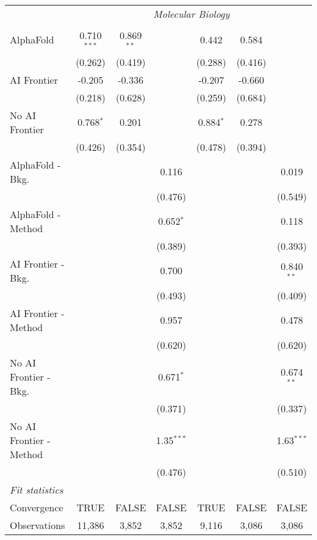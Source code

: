 \begin{tabular}{lcccccc}
 & \multicolumn{6}{c}{\textit{Molecular Biology}} \\ \\
   AlphaFold               & 0.710$^{***}$ & 0.869$^{**}$ &              & 0.442       & 0.584   &   \\   
                           & (0.262)       & (0.419)      &              & (0.288)     & (0.416) &   \\   
   AI Frontier             & -0.205        & -0.336       &              & -0.207      & -0.660  &   \\   
                           & (0.218)       & (0.628)      &              & (0.259)     & (0.684) &   \\   
   No AI Frontier          & 0.768$^{*}$   & 0.201        &              & 0.884$^{*}$ & 0.278   &   \\   
                           & (0.426)       & (0.354)      &              & (0.478)     & (0.394) &   \\   
   AlphaFold - Bkg.        &               &              & 0.116        &             &         & 0.019\\   
                           &               &              & (0.476)      &             &         & (0.549)\\   
   AlphaFold - Method      &               &              & 0.652$^{*}$  &             &         & 0.118\\   
                           &               &              & (0.389)      &             &         & (0.393)\\   
   AI Frontier - Bkg.      &               &              & 0.700        &             &         & 0.840$^{**}$\\   
                           &               &              & (0.493)      &             &         & (0.409)\\   
   AI Frontier - Method    &               &              & 0.957        &             &         & 0.478\\   
                           &               &              & (0.620)      &             &         & (0.620)\\   
   No AI Frontier - Bkg.   &               &              & 0.671$^{*}$  &             &         & 0.674$^{**}$\\   
                           &               &              & (0.371)      &             &         & (0.337)\\   
   No AI Frontier - Method &               &              & 1.35$^{***}$ &             &         & 1.63$^{***}$\\   
                           &               &              & (0.476)      &             &         & (0.510)\\   
   \midrule
   \emph{Fit statistics}\\
   Convergence             &TRUE           & FALSE        & FALSE        & TRUE        & FALSE   & FALSE\\  
   Observations            & 11,386        & 3,852        & 3,852        & 9,116       & 3,086   & 3,086\\  
   

\end{tabular}
